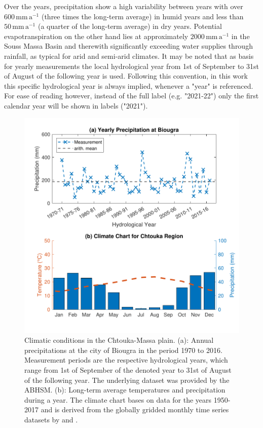 Over the years, precipitation show a high variability between years with over $600 \, \textrm{mm} \, \textrm{a}^{-1}$ (three times the long-term average) in humid years and less than $50 \, \textrm{mm} \, \textrm{a}^{-1}$ (a quarter of the long-term average) in dry years. Potential evapotranspiration on the other hand lies at approximately $2000 \, \textrm{mm} \, \textrm{a}^{-1}$ in the Souss Massa Basin \parencite{Choukr.2017} and therewith significantly exceeding water supplies through rainfall, as typical for arid and semi-arid climates. It may be noted that as basis for yearly measurements the local hydrological year from 1st of September to 31st of August of the following year is used. Following this convention, in this work this specific hydrological year is always implied, whenever a "year" is referenced. For ease of reading however, instead of the full label (e.g. "2021-22") only the first calendar year will be shown in labels ("2021").

\begin{figure}[p]
    \centering
    \includegraphics[width=1.0\textwidth]{./img/Fig-PrecNClimateChtouka.pdf}
    \caption{Climatic conditions in the Chtouka-Massa plain. (a): Annual precipitations at the city of Biougra in the period 1970 to 2016. Measurement periods are the respective hydrological years, which range from 1st of September of the denoted year to 31st of August of the following year. The underlying dataset was provided by the ABHSM. (b): Long-term average temperatures and precipitation during a year. The climate chart bases on data for the years 1950-2017 and is derived from the globally gridded monthly time series datasets by \textcite{Matsuura.2018T} and \textcite{Matsuura.2018P}.}
    \label{Fig-ClimateChart}
\end{figure}


